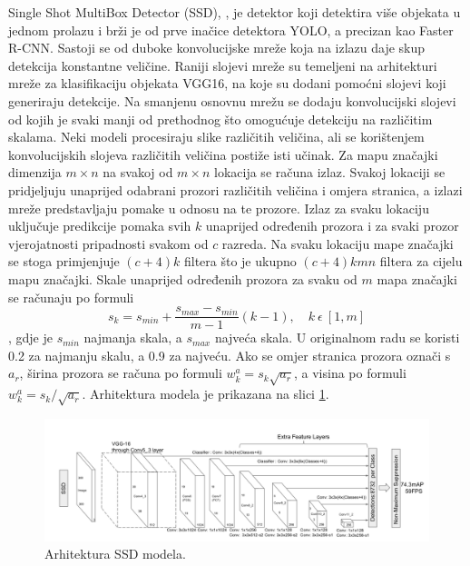 Single Shot MultiBox Detector (SSD), \cite{DBLP:journals/corr/LiuAESR15}, je detektor koji detektira više objekata u jednom prolazu i brži je od prve inačice detektora YOLO, a precizan kao Faster R-CNN. 
Sastoji se od duboke konvolucijske mreže koja na izlazu daje skup detekcija konstantne veličine. Raniji slojevi mreže su temeljeni na arhitekturi mreže za klasifikaciju objekata VGG16, na koje su dodani pomoćni slojevi koji generiraju detekcije. Na smanjenu osnovnu mrežu se dodaju konvolucijski slojevi od kojih je svaki manji od prethodnog što omogućuje detekciju na različitim skalama. Neki modeli procesiraju slike različitih veličina, ali se korištenjem konvolucijskih slojeva različitih veličina postiže isti učinak.
Za mapu značajki dimenzija $m \times n$ na svakoj od $m \times n$ lokacija se računa izlaz. Svakoj lokaciji se pridjeljuju unaprijed odabrani prozori različitih veličina i omjera stranica, a izlazi mreže predstavljaju pomake u odnosu na te prozore. Izlaz za svaku lokaciju uključuje predikcije pomaka svih $k$ unaprijed određenih prozora i za svaki prozor vjerojatnosti pripadnosti svakom od $c$ razreda. Na svaku lokaciju mape značajki se stoga primjenjuje $(c + 4)k$ filtera što je ukupno $(c + 4)kmn$ filtera za cijelu mapu značajki. Skale unaprijed određenih prozora za svaku od $m$ mapa značajki se računaju po formuli
\[
	s_k = s_{min} + \frac{s_{max} -s_{min}}{m - 1}(k - 1), \quad k \ \epsilon \ [1, m]
\], gdje je $s_{min}$ najmanja skala, a $s_{max}$ najveća skala. U originalnom radu se koristi 0.2 za najmanju skalu, a 0.9 za najveću. Ako se omjer stranica prozora označi s $a_r$, širina prozora se računa po formuli $w_k^a = s_k \sqrt{a_r}$, a visina po formuli $w_k^a = s_k / \sqrt{a_r}$. Arhitektura modela je prikazana na slici \ref{ssd_arhitektura}.

 \begin{figure}
	\centering
	\includegraphics[scale=0.5]{img/ssd_arhitektura.png}
	\caption{Arhitektura SSD modela.}
	\label{ssd_arhitektura}
\end{figure}

